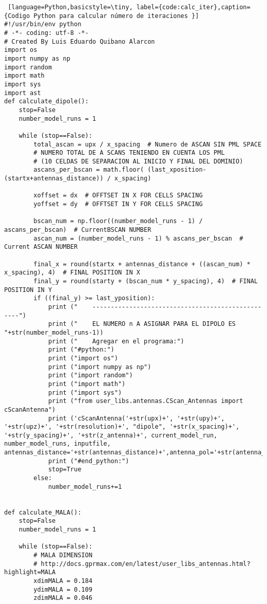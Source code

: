 \begin{lstlisting} [language=Python,basicstyle=\tiny, label={code:calc_iter},caption= {Codigo Python para calcular número de iteraciones }]
#!/usr/bin/env python
# -*- coding: utf-8 -*-
# Created By Luis Eduardo Quibano Alarcon
import os
import numpy as np
import random
import math
import sys
import ast
def calculate_dipole():
    stop=False
    number_model_runs = 1

    while (stop==False):
        total_ascan = upx / x_spacing  # Numero de ASCAN SIN PML SPACE
        # NUMERO TOTAL DE A SCANS TENIENDO EN CUENTA LOS PML
        # (10 CELDAS DE SEPARACION AL INICIO Y FINAL DEL DOMINIO)
        ascans_per_bscan = math.floor( (last_xposition-(startx+antennas_distance)) / x_spacing)

        xoffset = dx  # OFFTSET IN X FOR CELLS SPACING
        yoffset = dy  # OFFTSET IN Y FOR CELLS SPACING

        bscan_num = np.floor((number_model_runs - 1) / ascans_per_bscan)  # CurrentBSCAN NUMBER
        ascan_num = (number_model_runs - 1) % ascans_per_bscan  # Current ASCAN NUMBER

        final_x = round(startx + antennas_distance + ((ascan_num) * x_spacing), 4)  # FINAL POSITION IN X
        final_y = round(starty + (bscan_num * y_spacing), 4)  # FINAL POSITION IN Y
        if ((final_y) >= last_yposition):
            print ("    --------------------------------------------------")
            print ("    EL NUMERO n A ASIGNAR PARA EL DIPOLO ES "+str(number_model_runs-1))
            print ("    Agregar en el programa:")
            print ("#python:")
            print ("import os")
            print ("import numpy as np")
            print ("import random")
            print ("import math")
            print ("import sys")
            print ("from user_libs.antennas.CScan_Antennas import cScanAntenna")
            print ('cScanAntenna('+str(upx)+', '+str(upy)+', '+str(upz)+', '+str(resolution)+', "dipole", '+str(x_spacing)+', '+str(y_spacing)+', '+str(z_antenna)+', current_model_run, number_model_runs, inputfile, antennas_distance='+str(antennas_distance)+',antenna_pol='+str(antenna_pol)+')')
            print ("#end_python:")
            stop=True
        else:
            number_model_runs+=1


def calculate_MALA():
    stop=False
    number_model_runs = 1

    while (stop==False):
        # MALA DIMENSION
        # http://docs.gprmax.com/en/latest/user_libs_antennas.html?highlight=MALA
        xdimMALA = 0.184
        ydimMALA = 0.109
        zdimMALA = 0.046


\end{lstlisting}
